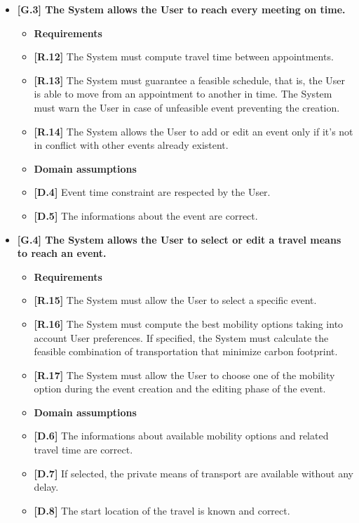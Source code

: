 \begin{itemize}
	\item \textbf{[G.3] The System allows the User to reach every meeting on time.}
	\begin{itemize}
		\item [] \textbf{Requirements}
		\item \textbf{[R.12]} The System must compute travel time between appointments.
		\item \textbf{[R.13]} The System must guarantee a feasible schedule, that is, the User is able to move from an appointment to another in time. The System must warn the User in case of unfeasible event preventing the creation. 
		\item \textbf{[R.14]} The System allows the User to add or edit an event only if it's not in conflict with other events already existent.
		\item [] \textbf{Domain assumptions}
		\item\textbf{[D.4]} Event time constraint are respected by the User.
		\item \textbf{[D.5]} The informations about the event are correct.
	\end{itemize}

	\item \textbf{[G.4] The System allows the User to select or edit a travel means to reach an event.}
	\begin{itemize}
		\item[] \textbf{Requirements}
		\item \textbf{[R.15]} The System must allow the User to select a specific event.
		\item \textbf{[R.16]} The System must compute the best mobility options taking into account User preferences. If specified, the System must calculate the feasible combination of transportation that minimize carbon footprint.
		\item  \textbf{[R.17]} The System must allow the User to choose one of the mobility option during the event creation and the editing phase of the event.
		\item[] \textbf{Domain assumptions}
		\item \textbf{[D.6]} The informations about available mobility options and related travel time are correct.
		\item \textbf{[D.7]} If selected, the private means of transport are available without any delay.
		\item \textbf{[D.8]} The start location of the travel is known and correct.
	\end{itemize} 


\end{itemize}
